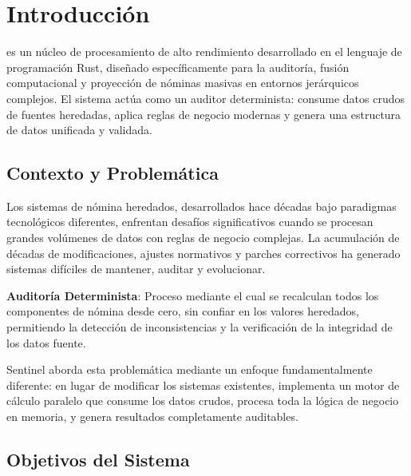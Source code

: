 \chapter{Introducción}

\bigskip

 es un núcleo de procesamiento de alto rendimiento desarrollado en el lenguaje de programación Rust, diseñado específicamente para la auditoría, fusión computacional y proyección de nóminas masivas en entornos jerárquicos complejos. El sistema actúa como un auditor determinista: consume datos crudos de fuentes heredadas, aplica reglas de negocio modernas y genera una estructura de datos unificada y validada.

\bigskip

\section{Contexto y Problemática}

Los sistemas de nómina heredados, desarrollados hace décadas bajo paradigmas tecnológicos diferentes, enfrentan desafíos significativos cuando se procesan grandes volúmenes de datos con reglas de negocio complejas. La acumulación de décadas de modificaciones, ajustes normativos y parches correctivos ha generado sistemas difíciles de mantener, auditar y evolucionar.

\bigskip

\begin{cajaDefinicion}
\textbf{Auditoría Determinista}: Proceso mediante el cual se recalculan todos los componentes de nómina desde cero, sin confiar en los valores heredados, permitiendo la detección de inconsistencias y la verificación de la integridad de los datos fuente.
\end{cajaDefinicion}

\bigskip

Sentinel aborda esta problemática mediante un enfoque fundamentalmente diferente: en lugar de modificar los sistemas existentes, implementa un motor de cálculo paralelo que consume los datos crudos, procesa toda la lógica de negocio en memoria, y genera resultados completamente auditables.

\bigskip

\section{Objetivos del Sistema}

